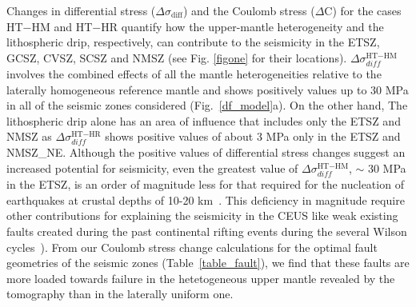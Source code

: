 \documentclass[draft,linenumbers]{agujournal2018}
\begin{document}
    
Changes in differential stress ($\Delta \sigma_{\text{diff}}$) and the Coulomb stress ($\Delta$C) for the cases HT$-$HM and HT$-$HR quantify how the upper-mantle heterogeneity and the lithospheric drip, respectively, can contribute to the seismicity in the ETSZ, GCSZ, CVSZ, SCSZ and NMSZ (see Fig. \ref{figone} for their locations).
$\Delta\sigma_{diff}^{\text{HT}-\text{HM}}$ involves the combined effects of all the mantle heterogeneities relative to the laterally homogeneous reference mantle and shows positively values up to 30 MPa in all of the seismic zones considered (Fig.~\ref{df_model}a). On the other hand, The lithospheric drip alone has an area of influence that includes only the ETSZ and NMSZ as $\Delta\sigma_{diff}^{\text{HT}-\text{HR}}$ %
shows positive values of about 3 MPa only in the ETSZ and NMSZ\_NE. Although the positive values of differential stress changes suggest an increased potential for seismicity, even the greatest value of $\Delta\sigma_{diff}^{\text{HT}-\text{HM}}$, $\sim$ 30 MPa in the ETSZ, is an order of magnitude less for that required for the nucleation of earthquakes at crustal depths of 10-20 km~\citep[e.g.][]{sibson1990rupture}. This deficiency in magnitude require other contributions for explaining the seismicity in the CEUS like weak existing faults created during the past continental rifting events during the several Wilson cycles~\citep{thomas2006tectonic}). From our Coulomb stress change calculations for the optimal fault geometries of the seismic zones (Table~\ref{table_fault}), we find that these faults are more loaded towards failure  in the hetetogeneous upper mantle revealed by the tomography than in the laterally uniform one.
       
    
\end{document}
